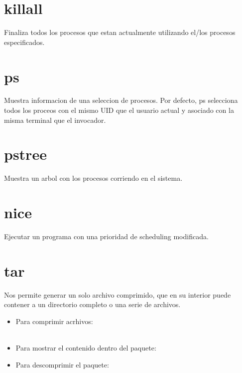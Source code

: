 \documentclass[11pt]{article}
\begin{document}
\section*{killall}
Finaliza todos los procesos que estan actualmente utilizando el/los procesos especificados.

\section*{ps}
Muestra informacion de una seleccion de procesos. Por defecto, ps selecciona todos los proceos con el mismo UID que el usuario actual y asociado con la misma terminal que el invocador.

\section*{pstree}
Muestra un arbol con los procesos corriendo en el sistema.

\section*{nice}
Ejecutar un programa con una prioridad de scheduling modificada.

\section*{tar}

Nos permite generar un solo archivo comprimido, que en su interior puede contener a un directorio completo o una serie de archivos.

\begin{itemize}

\item Para comprimir acrhivos:\\
\textbf{}\\

\item Para mostrar el contenido dentro del paquete:\\
\textbf{}

\item Para descomprimir el paquete:\\
\textbf{}\\
\end{itemize}
\end{document}

